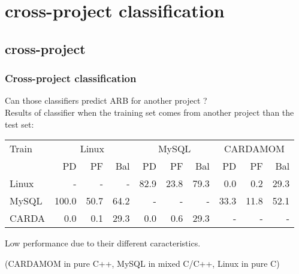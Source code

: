 \section{cross-project classification}
\subsection{cross-project}
\begin{frame}
 \frametitle{Cross-project classification}
 \alert{Can those classifiers predict ARB for another project ?}\\
 Results of classifier when the training set comes from another project than the test set:
 \begin{center}
 \begin{tabular}{l|r r r|r r r|r r r}
  Train & \multicolumn{3}{c}{Linux} & \multicolumn{3}{c}{MySQL} & \multicolumn{3}{c}{CARDAMOM}\\
  ~ & PD & PF & Bal & PD & PF & Bal & PD & PF & Bal\\
  \hline
  Linux & - & - & - & 82.9 & 23.8 & 79.3 & 0.0 & 0.2 & 29.3\\
  MySQL & 100.0 & 50.7 & 64.2 & - & - & - & 33.3 & 11.8 & 52.1\\
  CARDA & 0.0 & 0.1 & 29.3 & 0.0 & 0.6 & 29.3 & - & - & -\\
  \hline
 \end{tabular}
 \end{center}
 Low performance due to their different caracteristics.
 \begin{center}
  (CARDAMOM in pure C++, MySQL in mixed C/C++, Linux in pure C)
 \end{center}
\end{frame}
